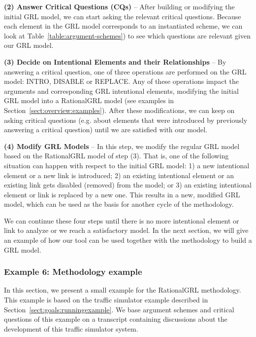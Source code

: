 \textbf{(2) Answer Critical Questions (CQs)} -- After building or modifying the initial GRL model, we can start asking the relevant critical questions. Because each element in the GRL model corresponds to an instantiated scheme, we can look at Table~\ref{table:argument-schemes}) to see which questions are relevant given our GRL model. 

\textbf{(3) Decide on Intentional Elements and their Relationships} -- By answering a critical question, one of three operations are performed on the GRL model: \textsf{INTRO}, \textsf{DISABLE} or \textsf{REPLACE}. Any of these operations impact the arguments and corresponding GRL intentional elements, modifying the initial GRL model into a RationalGRL model (see examples in Section~\ref{sect:overview:examples}). After these modifications, we can keep on asking critical questions (e.g. about elements that were introduced by previously answering a critical question) until we are satisfied with our model.   

\textbf{(4) Modify GRL Models} -- In this step, we modify the regular GRL model based on the RationalGRL model of step (3). That is, one of the following situation can happen with respect to the initial GRL model: 1) a new intentional element or a new link is introduced; 2) an existing intentional element or an existing link gets disabled (removed) from the model; or 3) an existing intentional element or link is replaced by a new one. This results in a new, modified GRL model, which can be used as the basis for another cycle of the methodology. 

We can continue these four steps until there is no more intentional element or link to analyze or we reach a satisfactory model. In the next section, we will give an example of how our tool can be used together with the methodology to build a GRL model.  

\iffalse%
\subsubsection{Example 6: Methodology example}

In this section, we present a small example for the RationalGRL methodology. This example is based on the traffic simulator example described in Section~\ref{sect:goals:runningexample}. We base argument schemes and critical questions of this example on a transcript containing discussions about the development of this traffic simulator system. %

